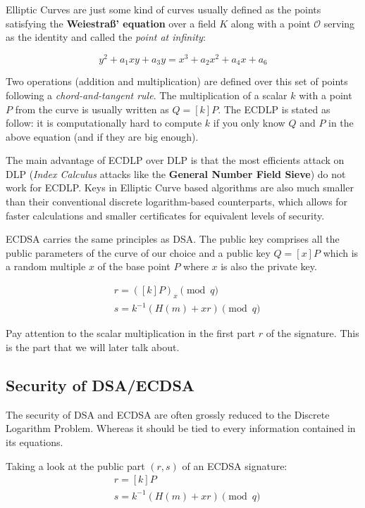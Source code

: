 \documentclass[a4paper,11pt]{article}
\begin{document}
Elliptic Curves are just some kind of curves usually defined as the points satisfying the \textbf{Weiestraß' equation} over a field $K$ along with a point $\mathcal{O}$ serving as the identity and called the \textit{point at infinity}:

$$ y^2 + a_1xy + a_3y = x^3 + a_2x^2 + a_4x + a_6 $$

Two operations (addition and multiplication) are defined over this set of points following a \textit{chord-and-tangent rule}. The multiplication of a scalar $k$ with a point $P$ from the curve is usually written as $Q = [k]P$. The ECDLP is stated as follow: it is computationally hard to compute $k$ if you only know $Q$ and $P$ in the above equation (and if they are big enough).

The main advantage of ECDLP over DLP is that the most efficients attack on DLP (\textit{Index Calculus} attacks like the \textbf{General Number Field Sieve}) do not work for ECDLP. Keys in Elliptic Curve based algorithms are also much smaller than their conventional discrete logarithm-based counterparts, which allows for faster calculations and smaller certificates for equivalent levels of security. 

ECDSA carries the same principles as DSA. The public key comprises all the public parameters of the curve of our choice and a public key $Q = [x]P$ which is a random multiple $x$ of the base point $P$  where $x$ is also the private key.

\begin{align*}
&r = ([k]P)_x \pmod{q}\\
&s = k^{-1} ( H(m) + x r ) \pmod{q}
\end{align*}

Pay attention to the scalar multiplication in the first part $r$ of the signature. This is the part that we will later talk about.

\subsection{Security of DSA/ECDSA}\label{security_dsa_ecdsa}

The security of DSA and ECDSA are often grossly reduced to the Discrete Logarithm Problem. Whereas it should be tied to every information contained in its equations.

Taking a look at the public part $(r, s)$ of an ECDSA signature:
\begin{align*}
&r = [k] P\\
&s = k^{-1} ( H(m) + x r ) \pmod{q}
\end{align*}
\end{document}
